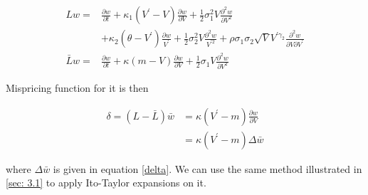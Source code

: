 \begin{equation}\label{inf gen2}
    \begin{aligned}
        L w=& \frac{\partial w}{\partial t}+\kappa_1(V^{\prime} - V) \frac{\partial w}{\partial V}+\frac{1}{2} \sigma_1^{2} V \frac{\partial^{2} w}{\partial V^{2}} \\
        &+ \kappa_2(\theta - V^{\prime}) \frac{\partial w}{V^{\prime}}+\frac{1}{2} \sigma_2^{2} V \frac{\partial^{2} w}{V^{\prime 2}} + \rho \sigma_1 \sigma_2 \sqrt{V} V^{\prime \gamma_2} \frac{\partial^2 w}{\partial V \partial V^{\prime}}\\
        \bar{L} w =& \frac{\partial w}{\partial t}+\kappa(m - V) \frac{\partial w}{\partial V}+\frac{1}{2} \sigma_1 V \frac{\partial^{2} w}{\partial V^{2}}
    \end{aligned}
\end{equation}

\noindent Mispricing function for it is then

$$
\begin{aligned}
    \delta = (L - \bar{L}) \bar{w} &= \kappa(V^{\prime}- m)\frac{\partial w}{\partial V} \\
    &= \kappa(V^{\prime}-m) \Delta{\bar{w}}
\end{aligned}
$$

\noindent where $\Delta{\bar{w}}$ is given in equation \eqref{delta}. We can use the same method illustrated in \ref{sec: 3.1} to apply Ito-Taylor expansions on it.